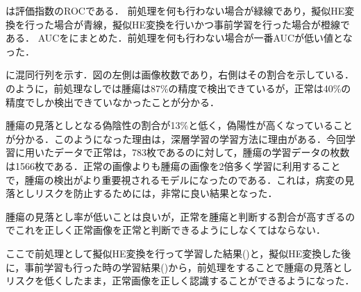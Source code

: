 は評価指数のROCである．  
前処理を何も行わない場合が緑線であり，擬似HE変換を行った場合が青線，擬似HE変換を行いかつ事前学習を行った場合が橙線である．
AUCをにまとめた．前処理を何も行わない場合が一番AUCが低い値となった．

に混同行列を示す．図の左側は画像枚数であり，右側はその割合を示している．
のように，前処理なしでは腫瘍は87\%の精度で検出できているが，正常は40\%の精度でしか検出できていなかったことが分かる．

腫瘍の見落としとなる偽陰性の割合が13\%と低く，偽陽性が高くなっていることが分かる．このようになった理由は，深層学習の学習方法に理由がある．今回学習に用いたデータで正常は，783枚であるのに対して，腫瘍の学習データの枚数は1566枚である．正常の画像よりも腫瘍の画像を2倍多く学習に利用することで，腫瘍の検出がより重要視されるモデルになったのである．これは，病変の見落としリスクを防止するためには，非常に良い結果となった．

腫瘍の見落とし率が低いことは良いが，正常を腫瘍と判断する割合が高すぎるのでこれを正しく正常画像を正常と判断できるようにしなくてはならない．

ここで前処理として擬似HE変換を行って学習した結果()と，擬似HE変換した後に，事前学習も行った時の学習結果()から，前処理をすることで腫瘍の見落としリスクを低くしたまま，正常画像を正しく認識することができるようになった．

